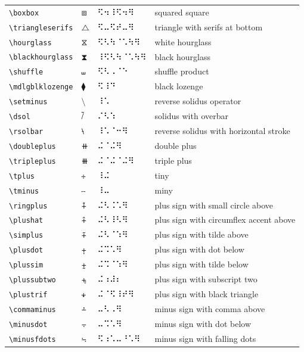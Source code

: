\documentclass[oneside]{article}
\begin{document}
\begin{longtable}{llll}
\verb|\boxbox| & $\boxbox$ &  ⠫⠲⠸⠫⠲⠻  & {squared square} \\[2ex]
\verb|\triangleserifs| & $\triangleserifs$ &  ⠫⠤⠫⠞⠤⠻  & {triangle with serifs at bottom} \\[2ex]
\verb|\hourglass| & $\hourglass$ &  ⠫⠣⠳⠈⠡⠳⠻  & {white hourglass} \\[2ex]
\verb|\blackhourglass| & $\blackhourglass$ &  ⠸⠫⠣⠳⠈⠡⠳⠻  & {black hourglass} \\[2ex]
\verb|\shuffle| & $\shuffle$ &  ⠫⠣⠠⠈⠑  & {shuffle product} \\[2ex]
\verb|\mdlgblklozenge| & $\mdlgblklozenge$ &  ⠫⠸⠙  & {black lozenge} \\[2ex]
\verb|\setminus| & $\setminus$ &  ⠸⠡  & {reverse solidus operator} \\[2ex]
\verb|\dsol| & $\dsol$ &  ⠌⠣⠱  & {solidus with overbar} \\[2ex]
\verb|\rsolbar| & $\rsolbar$ &  ⠸⠡⠈⠒⠻  & {reverse solidus with horizontal stroke} \\[2ex]
\verb|\doubleplus| & $\doubleplus$ &  ⠬⠈⠬⠻  & {double plus} \\[2ex]
\verb|\tripleplus| & $\tripleplus$ &  ⠬⠈⠬⠈⠬⠻  & {triple plus} \\[2ex]
\verb|\tplus| & $\tplus$ &  ⠸⠬  & {tiny} \\[2ex]
\verb|\tminus| & $\tminus$ &  ⠸⠤  & {miny} \\[2ex]
\verb|\ringplus| & $\ringplus$ &  ⠬⠣⠨⠡⠻  & {plus sign with small circle above} \\[2ex]
\verb|\plushat| & $\plushat$ &  ⠬⠣⠸⠣⠻  & {plus sign with circumflex accent above} \\[2ex]
\verb|\simplus| & $\simplus$ &  ⠬⠣⠈⠱⠻  & {plus sign with tilde above} \\[2ex]
\verb|\plusdot| & $\plusdot$ &  ⠬⠩⠡⠻  & {plus sign with dot below} \\[2ex]
\verb|\plussim| & $\plussim$ &  ⠬⠩⠈⠱⠻  & {plus sign with tilde below} \\[2ex]
\verb|\plussubtwo| & $\plussubtwo$ &  ⠬⠰⠼⠆  & {plus sign with subscript two} \\[2ex]
\verb|\plustrif| & $\plustrif$ &  ⠬⠈⠫⠸⠞⠻  & {plus sign with black triangle} \\[2ex]
\verb|\commaminus| & $\commaminus$ &  ⠤⠣⠠⠻  & {minus sign with comma above} \\[2ex]
\verb|\minusdot| & $\minusdot$ &  ⠤⠩⠡⠻  & {minus sign with dot below} \\[2ex]
\verb|\minusfdots| & $\minusfdots$ &  ⠫⠰⠡⠤⠘⠡⠻  & {minus sign with falling dots} \\[2ex]

\end{longtable}
\end{document}
